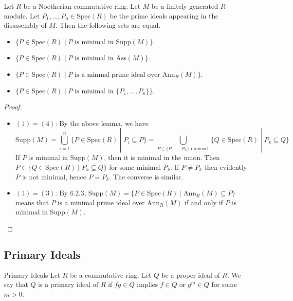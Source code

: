 \documentclass[a4paper]{article}
\begin{document}
\begin{prp}{}{} Let $R$ be a Noetherian commutative ring. Let $M$ be a finitely generated $R$-module. Let $P_1,\dots,P_n\in\text{Spec}(R)$ be the prime ideals appearing in the disassembly of $M$. Then the following sets are equal. 
\begin{itemize}
\item $\{P\in\text{Spec}(R)\;|\;P\text{ is minimal in }\text{Supp}(M)\}$. 
\item $\{P\in\text{Spec}(R)\;|\;P\text{ is minimal in }\text{Ass}(M)\}$. 
\item $\{P\in\text{Spec}(R)\;|\;P\text{ is a minmal prime ideal over }\text{Ann}_R(M)\}$. 
\item $\{P\in\text{Spec}(R)\;|\;P\text{ is minimal in }\{P_1,\dots,P_n\}\}$. 
\end{itemize} 
\begin{proof}\\
\begin{itemize}
\item $(1)=(4)$: By the above lemma, we have $$\text{Supp}(M)=\bigcup_{i=1}^n\{P\in\text{Spec}(R)\;|\;P_i\subseteq P\}=\bigcup_{P\in\{P_1,\dots,P_n\}\text{ minimal }}\{Q\in\text{Spec}(R)\;|\;P_k\subseteq Q\}$$ If $P$ is minimal in $\text{Supp}(M)$, then it is minimal in the union. Then $P\in\{Q\in\text{Spec}(R)\;|\;P_k\subseteq Q\}$ for some minimal $P_k$. If $P\neq P_k$ then evidently $P$ is not minimal, hence $P=P_k$. The converse is similar. 
\item $(1)=(3)$: By 6.2.3, $\text{Supp}(M)=\{P\in\text{Spec}(R)\;|\;\text{Ann}_R(M)\subseteq P\}$ means that $P$ is a minimal prime ideal over $\text{Ann}_R(M)$ if and only if $P$ is minimal in $\text{Supp}(M)$. 
\end{itemize}
\end{proof}
\end{prp}

\subsection{Primary Ideals}
\begin{defn}{Primary Ideals}{} Let $R$ be a commutative ring. Let $Q$ be a proper ideal of $R$. We say that $Q$ is a primary ideal of $R$ if $fg\in Q$ implies $f\in Q$ or $g^m\in Q$ for some $m>0$. 
\end{defn}
\end{document}
